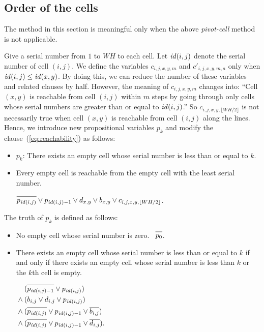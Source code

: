 \documentclass[a4paper]{article}
\newcommand{\N}[1]{\overline{#1\vphantom{l}}}
\begin{document}
\subsection{Order of the cells}

The method in this section is meaningful only when
the above \emph{pivot-cell} method is not applicable.

Give a serial number from $1$ to $WH$ to each cell.
Let $\mathit{id}(i,j)$ denote the serial number of cell $(i,j)$.
We define the variables $c_{i,j,x,y,m}$ and $c'_{i,j,x,y,m,a}$
only when $\mathit{id}(i,j)\le\mathit{id}(x,y)$.
By doing this, we can reduce the number of these variables and
related clauses by half.
%
However, the meaning of $c_{i,j,x,y,m}$ changes into:
``Cell $(x,y)$ is reachable from cell $(i,j)$ within $m$ steps
by going through only cells whose serial numbers are greater than or equal to
$\mathit{id}(i,j)$.''
So $c_{i,j,x,y,\lfloor WH/2\rfloor}$ is not necessarily true when
cell $(x,y)$ is reachable from cell $(i,j)$ along the lines.
Hence, we introduce new propositional variables $p_k$ and
modify the clause~(\ref{eq:reachability}) as follows:

\begin{itemize}
\item $p_k$:
  There exists an empty cell whose serial number is less than or equal to $k$.
\item
  Every empty cell is reachable
  from the empty cell with the least serial number.
  \par\qquad
  $\N{p_{\id(i,j)}}\lor{p_{\id(i,j)-1}}\lor
   d_{x,y}\lor b_{x,y}\lor
   c_{i,j,x,y,\lfloor WH/2\rfloor}$.
\end{itemize}
%
The truth of $p_k$ is defined as follows:
\begin{itemize}
\item
  No empty cell whose serial number is zero. \
  $\N{p_0}$.
\item
  There exists an empty cell whose serial number is less than or equal to
  $k$ if and only if there exists an empty cell whose serial number
  is less than $k$ or the $k$th cell is empty.
  \par\qquad
  $\begin{aligned}[t]
   &(\N{p_{\id(i,j)-1}}\lor p_{\id(i,j)}) \\ {}\land{}
   &(b_{i,j}\lor d_{i,j}\lor p_{\id(i,j)}) \\ {}\land{}
   &(\N{p_{\id(i,j)}}\lor p_{\id(i,j)-1}\lor \N{b_{i,j}}) \\ {}\land{}
   &(\N{p_{\id(i,j)}}\lor p_{\id(i,j)-1}\lor \N{d_{i,j}}).
   \end{aligned}$
\end{itemize}
\end{document}
